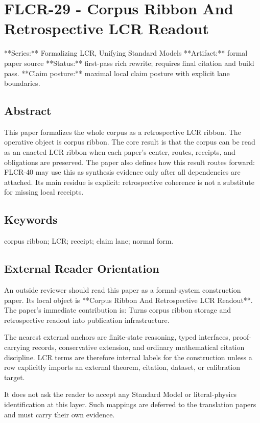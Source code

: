 \documentclass[11pt]{article}
\begin{document}
\section*{FLCR-29 - Corpus Ribbon And Retrospective LCR Readout}

**Series:** Formalizing LCR, Unifying Standard Models
**Artifact:** formal paper source
**Status:** first-pass rich rewrite; requires final citation and build pass.
**Claim posture:** maximal local claim posture with explicit lane boundaries.

\subsection*{Abstract}

This paper formalizes the whole corpus as a retrospective LCR ribbon. The operative object is corpus ribbon. The core result is that the corpus can be read as an enacted LCR ribbon when each paper's center, routes, receipts, and obligations are preserved. The paper also defines how this result routes forward: FLCR-40 may use this as synthesis evidence only after all dependencies are attached. Its main residue is explicit: retrospective coherence is not a substitute for missing local receipts.

\subsection*{Keywords}

corpus ribbon; LCR; receipt; claim lane; normal form.

\subsection*{External Reader Orientation}

An outside reviewer should read this paper as a formal-system construction paper. Its local object is **Corpus Ribbon And Retrospective LCR Readout**. The paper's immediate contribution is: Turns corpus ribbon storage and retrospective readout into publication infrastructure.

The nearest external anchors are finite-state reasoning, typed interfaces, proof-carrying records, conservative extension, and ordinary mathematical citation discipline. LCR terms are therefore internal labels for the construction unless a row explicitly imports an external theorem, citation, dataset, or calibration target.

It does not ask the reader to accept any Standard Model or literal-physics identification at this layer. Such mappings are deferred to the translation papers and must carry their own evidence.
\end{document}
